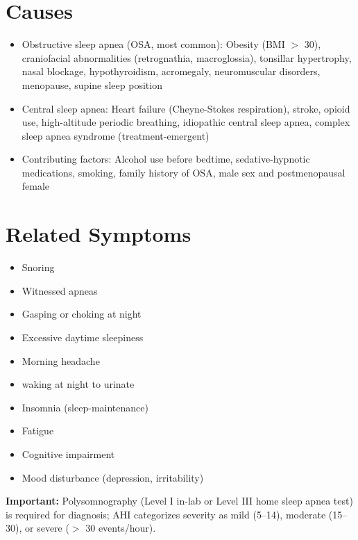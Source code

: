 \section*{Causes}
\begin{itemize}
  \item Obstructive sleep apnea (OSA, most common): Obesity (BMI $>$ 30), craniofacial abnormalities (retrognathia, macroglossia), tonsillar hypertrophy, nasal blockage, hypothyroidism, acromegaly, neuromuscular disorders, menopause, supine sleep position
  \item Central sleep apnea: Heart failure (Cheyne-Stokes respiration), stroke, opioid use, high-altitude periodic breathing, idiopathic central sleep apnea, complex sleep apnea syndrome (treatment-emergent)
  \item Contributing factors: Alcohol use before bedtime, sedative-hypnotic medications, smoking, family history of OSA, male sex and postmenopausal female
\end{itemize}

\section*{Related Symptoms}
\begin{itemize}
  \item Snoring
  \item Witnessed apneas
  \item Gasping or choking at night
  \item Excessive daytime sleepiness
  \item Morning headache
  \item waking at night to urinate
  \item Insomnia (sleep-maintenance)
  \item Fatigue
  \item Cognitive impairment
  \item Mood disturbance (depression, irritability)
\end{itemize}
\textbf{Important:} Polysomnography (Level I in-lab or Level III home sleep apnea test) is required for diagnosis; AHI categorizes severity as mild (5--14), moderate (15--30), or severe ($>$ 30 events/hour).

